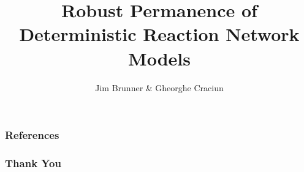 \documentclass{beamer}
\author[Brunner \& Craciun]{Jim Brunner \& Gheorghe Craciun}
\institute[UW Madison]{University of Wisconsin - Madison}
\title{Robust Permanence of Deterministic Reaction Network Models}
\date{}
\begin{document}
\begin{frame}
\titlepage
\phantom{\cite{}}
\end{frame}

\begin{frame}
\frametitle{References}

\renewcommand\bibfont{\scriptsize}

\end{frame}
\begin{frame}
\frametitle{Thank You}


\end{frame}
\end{document}
